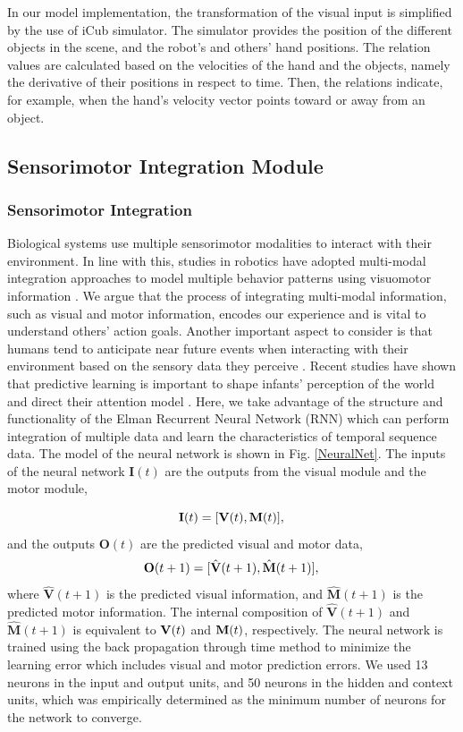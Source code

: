 \documentclass[conference]{IEEEtran}
\begin{document}
In our model implementation, the transformation of the visual input is simplified by the use of iCub simulator. The simulator provides the position of the different objects in the scene, and the robot's and others' hand positions. The relation values are calculated based on the velocities of the hand and the objects, namely the derivative of their positions in respect to time. Then, the relations indicate, for example, when the hand's velocity vector points toward or away from an object.

\subsection{Sensorimotor Integration Module}
\subsubsection{Sensorimotor Integration}
Biological systems use multiple sensorimotor modalities to interact with their environment. In line with this, studies in robotics have adopted multi-modal integration approaches to model multiple behavior patterns using visuomotor information \cite{noda2014multimodal}. We argue that the process of integrating multi-modal information, such as visual and motor information, encodes our experience and is vital to understand others' action goals. Another important aspect to consider is that humans tend to anticipate near future events when interacting with their environment based on the sensory data they perceive \cite{cannon2012infants}. Recent studies have shown that predictive learning is important to shape infants' perception of the world and direct their attention model \cite{den2012prediction}. Here, we take advantage of the structure and functionality of the Elman Recurrent Neural Network (RNN) \cite{elman1990finding} which can perform integration of multiple data and learn the characteristics of temporal sequence data. The model of the neural network is shown in Fig. \ref{NeuralNet}. The inputs of the neural network \(\textbf{I}(t)\) are the outputs from the visual module and the motor module,

\begin{equation}
	\textbf{I}(t)=[\textbf{V}(t), \textbf{M}(t)],\\
\end{equation}
and the outputs \(\textbf{O}(t)\) are the predicted visual and motor data,
\begin{equation}
	\textbf{O}(t+1)=[\hat{\textbf{V}}(t+1), \hat{\textbf{M}}(t+1)],\\
\end{equation}
where \(\hat{\textbf{V}}(t+1)\) is the predicted visual information, and  \(\hat{\textbf{M}}(t+1)\) is the predicted motor information. The internal composition of \(\hat{\textbf{V}}(t+1)\) and \(\hat{\textbf{M}}(t+1)\) is equivalent to \(\text{\textbf{V}}(t)\) and \(\text{\textbf{M}}(t)\), respectively. The neural network is trained using the back propagation through time method to minimize the learning error which includes visual and motor prediction errors. We used 13 neurons in the input and output units, and 50 neurons in the hidden and context units, which was empirically determined as the minimum number of neurons for the network to converge.
\end{document}
